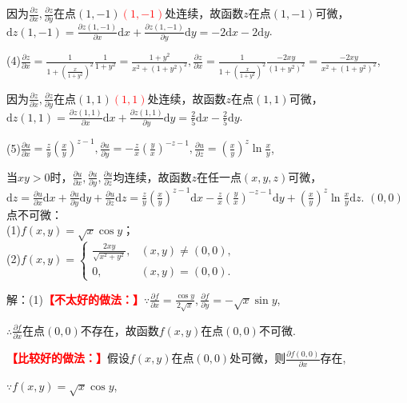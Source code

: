 \documentclass[12pt,UTF8]{ctexart}
\begin{document}
\begin{enumerate}
因为$\frac{\partial z}{\partial x},\frac{\partial z}{\partial y}$在点$(1,-1)$\textcolor{red}{$(1,-1)$}处连续，故函数$z$在点$(1,-1)$可微，\\
$\mathrm dz(1,-1)=\frac{\partial z(1,-1)}{\partial x}\mathrm dx+\frac{\partial z(1,-1)}{\partial y}\mathrm dy=-2\mathrm dx-2\mathrm dy$.

(4)$\frac{\partial z}{\partial x}=\frac1{1+(\frac x{1+y^2})^2}\frac1{1+y^2}=\frac{1+y^2}{x^2+(1+y^2)^2},\frac{\partial z}{\partial x}=\frac1{1+(\frac x{1+y^2})^2}\frac{-2xy}{(1+y^2)^2}=\frac{-2xy}{x^2+(1+y^2)^2}$,

因为$\frac{\partial z}{\partial x},\frac{\partial z}{\partial y}$在点$(1,1)$\textcolor{red}{$(1,1)$}处连续，故函数$z$在点$(1,1)$可微，\\
$\mathrm dz(1,1)=\frac{\partial z(1,1)}{\partial x}\mathrm dx+\frac{\partial z(1,1)}{\partial y}\mathrm dy=\frac25\mathrm dx-\frac25\mathrm dy$.

(5)$\frac{\partial u}{\partial x}=\frac zy(\frac xy)^{z-1},\frac{\partial u}{\partial y}=-\frac zx(\frac yx)^{-z-1},\frac{\partial u}{\partial z}=(\frac xy)^z\ln\frac xy$,

当$xy>0$时，$\frac{\partial u}{\partial x},\frac{\partial u}{\partial y},\frac{\partial u}{\partial z}$均连续，故函数$z$在任一点$(x,y,z)$可微，\\
$\mathrm dz=\frac{\partial u}{\partial x}\mathrm dx+\frac{\partial u}{\partial y}\mathrm dy+\frac{\partial u}{\partial z}\mathrm dz=\frac zy(\frac xy)^{z-1}\mathrm dx-\frac zx(\frac yx)^{-z-1}\mathrm dy+(\frac xy)^z\ln\frac xy\mathrm dz$.
$(0,0)$点不可微：\\
(1)$f(x,y)=\sqrt x\cos y$；\\
(2)$f(x,y)=\begin{cases}
\frac{2xy}{\sqrt{x^2+y^2}},&(x,y)\neq(0,0),\\
0,&(x,y)=(0,0).
\end{cases}$

解：(1)\textcolor{red}{\bf【不太好的做法：】}$\because\frac{\partial f}{\partial x}=\frac{\cos y}{2\sqrt x},\frac{\partial f}{\partial y}=-\sqrt x\sin y$,

$\therefore\frac{\partial f}{\partial x}$在点$(0,0)$不存在，故函数$f(x,y)$在点$(0,0)$不可微.

\textcolor{red}{\bf【比较好的做法：】}假设$f(x,y)$在点$(0,0)$处可微，则$\frac{\partial f(0,0)}{\partial x}$存在,

$\because f(x,y)=\sqrt x\cos y$,


\end{enumerate}
\end{document}
